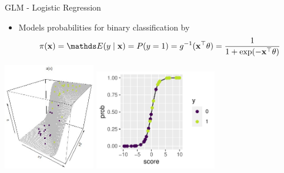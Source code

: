 \documentclass[11pt,compress,t,notes=noshow, aspectratio=169, xcolor=table]{beamer}
\begin{document}
\begin{frame}{GLM - Logistic Regression}
\begin{itemize}
    \item Models probabilities for binary classification by
    $$\pi(\xv) = \E(y \mid \xv) = P(y = 1) = g^{-1}(\xv^\top \theta) = \frac{1}{1 + \exp(- \xv^\top \theta)} $$
\end{itemize}
\centering
\includegraphics[width=0.3\textwidth]{figure/logreg-2vars-surface.png} \qquad
\includegraphics[width=0.4\textwidth]{figure/reg_class_log_7} 
\end{frame}
\end{document}
